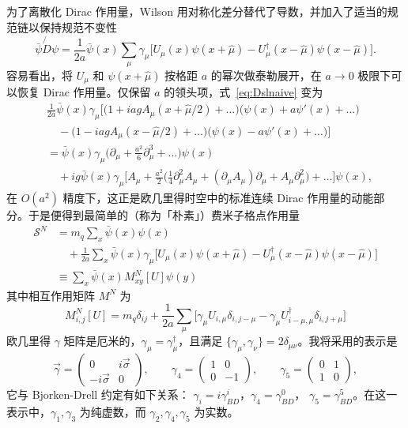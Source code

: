 为了离散化 Dirac 作用量，Wilson 用对称化差分替代了导数，并加入了适当的规范链以保持规范不变性
\begin{equation}
\label{eq:Dslnaive}
\bar\psi\not{D}\psi = \frac{1}{2a}\bar\psi(x)\sum_\mu\gamma_\mu
\big[ U_\mu(x)\psi(x+\hat{\mu}) - U_\mu^\dagger(x-\hat{\mu})
      \psi(x-\hat{\mu}) \big] .
\end{equation}
容易看出，将 $U_\mu$ 和 $\psi(x+\hat{\mu})$ 按格距 $a$ 的幂次做泰勒展开，在 $a \to 0$ 极限下可以恢复 Dirac 作用量。仅保留 $a$ 的领头项，式~\ref{eq:Dslnaive} 变为
\[
\begin{aligned}
&\frac{1}{2a}\bar\psi(x)\gamma_\mu\Big[
   \big(1+iagA_\mu(x+\hat{\mu}/2)+\ldots\big)
   \big(\psi(x)+a\psi'(x)+\ldots\big) \\
&\quad - \big(1-iagA_\mu(x-\hat{\mu}/2)+\ldots\big)
   \big(\psi(x)-a\psi'(x)+\ldots\big) \Big] \\
&= \bar\psi(x)\gamma_\mu\Big(\partial_\mu + \frac{a^2}{6}\partial_\mu^3 +
   \ldots\Big)\psi(x) \\
&\quad + ig\bar\psi(x)\gamma_\mu\Big[A_\mu + \frac{a^2}{2}\Big(
   \frac{1}{4}\partial_\mu^2 A_\mu + (\partial_\mu A_\mu)\partial_\mu +
   A_\mu\partial_\mu^2\Big) + \ldots \Big]\psi(x) ,
\end{aligned}
\]
在 $O(a^2)$ 精度下，这正是欧几里得时空中的标准连续 Dirac 作用量的动能部分。于是便得到最简单的（称为「朴素」）费米子格点作用量
\begin{equation}
\label{eq:naiveact}
\begin{aligned}
\mathcal{S}^N &= m_q\sum_x\bar\psi(x)\psi(x) \\
&\quad + \frac{1}{2a}\sum_x\bar\psi(x)\gamma_\mu\big[
   U_\mu(x)\psi(x+\hat{\mu}) - U_\mu^\dagger(x-\hat{\mu})
   \psi(x-\hat{\mu}) \big] \\
&\equiv \sum_x\bar\psi(x)M_{xy}^N[U]\psi(y)
\end{aligned}
\end{equation}
其中相互作用矩阵 $M^N$ 为
\begin{equation}
\label{eq:naiveactM}
M_{i,j}^N[U] = m_q\delta_{ij} + \frac{1}{2a}\sum_\mu
\big[ \gamma_\mu U_{i,\mu}\delta_{i,j-\mu} -
      \gamma_\mu U_{i-\mu,\mu}^\dagger\delta_{i,j+\mu} \big]
\end{equation}
欧几里得 $\gamma$ 矩阵是厄米的，$\gamma_\mu = \gamma_\mu^\dagger$，且满足 $\{\gamma_\mu,\gamma_\nu\} = 2\delta_{\mu\nu}$。我将采用的表示是
\begin{equation}
\label{eq:gammamatdef}
\vec\gamma = \begin{pmatrix} 0 & i\vec\sigma \\ -i\vec\sigma & 0 \end{pmatrix},
\qquad
\gamma_4 = \begin{pmatrix} 1 & 0 \\ 0 & -1 \end{pmatrix},
\qquad
\gamma_5 = \begin{pmatrix} 0 & 1 \\ 1 & 0 \end{pmatrix} ,
\end{equation}
它与 Bjorken-Drell 约定有如下关系：
$\gamma_i = i\gamma_{BD}^i$，$\gamma_4 = \gamma_{BD}^0$，
$\gamma_5 = \gamma_{BD}^5$。在这一表示中，$\gamma_1, \gamma_3$ 为纯虚数，而 $\gamma_2, \gamma_4, \gamma_5$ 为实数。

